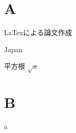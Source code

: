 \documentclass{jarticle}
\begin{document}
\tableofcontents

\section{A}
LaTexによる論文作成

Japan

平方根 $\sqrt{x}$


\section{B}
a
\end{document}
